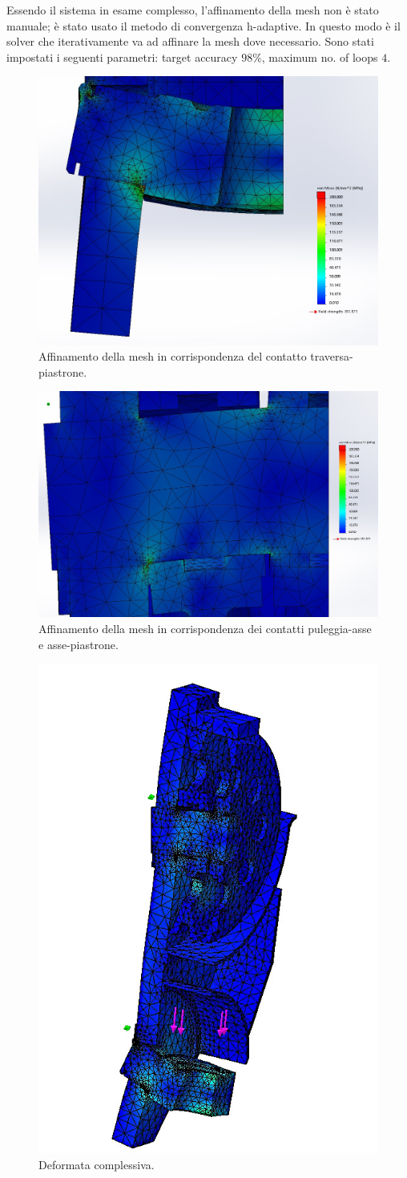 Essendo il sistema in esame complesso, l'affinamento della mesh non è stato manuale; è stato usato il metodo di convergenza h-adaptive.
In questo modo è il solver che iterativamente va ad affinare la mesh dove necessario. 
Sono stati impostati i seguenti parametri: target accuracy $98 \%$, maximum no. of loops $4$. 
\begin{figure}[H]
\centering
  \includegraphics[width=.5\textwidth]{imgs/fem/Quarto1}
\caption{Affinamento della mesh in corrispondenza del contatto traversa-piastrone.}
\label{fig:Quarto1}
\end{figure}
\begin{figure}[H]
\centering
  \includegraphics[width=.5\textwidth]{imgs/fem/Quarto2}
\caption{Affinamento della mesh in corrispondenza dei contatti puleggia-asse e asse-piastrone.}
\label{fig:Quarto2}
\end{figure}
\begin{figure}[H]
\centering
  \includegraphics[width=.45\textwidth]{imgs/fem/Quarto3}
\caption{Deformata complessiva.}
\label{fig:Quarto3}
\end{figure}
